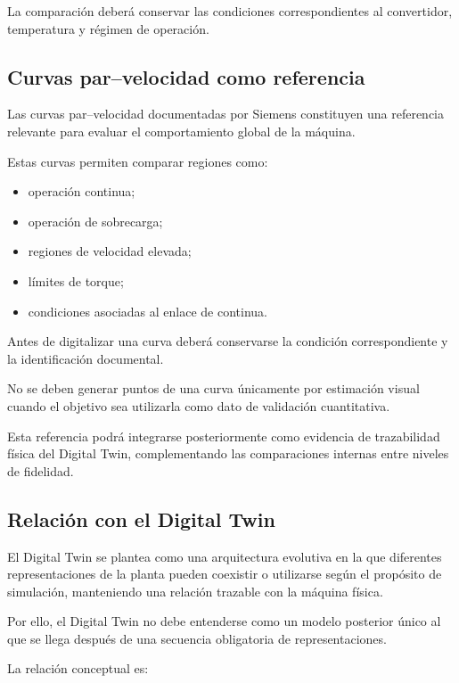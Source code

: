 La comparación deberá conservar las condiciones correspondientes al convertidor, temperatura y régimen de operación.

\subsection{Curvas par--velocidad como referencia}

Las curvas par--velocidad documentadas por Siemens constituyen una referencia relevante para evaluar el comportamiento global de la máquina.

Estas curvas permiten comparar regiones como:

\begin{itemize}
\item operación continua;
\item operación de sobrecarga;
\item regiones de velocidad elevada;
\item límites de torque;
\item condiciones asociadas al enlace de continua.
\end{itemize}

Antes de digitalizar una curva deberá conservarse la condición correspondiente y la identificación documental.

No se deben generar puntos de una curva únicamente por estimación visual cuando el objetivo sea utilizarla como dato de validación cuantitativa.

Esta referencia podrá integrarse posteriormente como evidencia de trazabilidad física del Digital Twin, complementando las comparaciones internas entre niveles de fidelidad.

\subsection{Relación con el Digital Twin}

El Digital Twin se plantea como una arquitectura evolutiva en la que diferentes representaciones de la planta pueden coexistir o utilizarse según el propósito de simulación, manteniendo una relación trazable con la máquina física.

Por ello, el Digital Twin no debe entenderse como un modelo posterior único al que se llega después de una secuencia obligatoria de representaciones.

La relación conceptual es:

